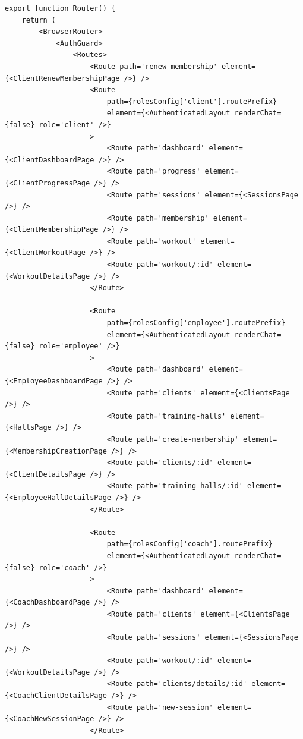 \documentclass[../../spr.tex]{subfiles}
\begin{document}
\begin{lstlisting}[caption=Komponent realizujący \textit{routing} w aplikacji. Definiuje ścieżki i komponenty generujące poszczególne ekrany.]
export function Router() {
    return (
        <BrowserRouter>
            <AuthGuard>
                <Routes>
                    <Route path='renew-membership' element={<ClientRenewMembershipPage />} />
                    <Route
                        path={rolesConfig['client'].routePrefix}
                        element={<AuthenticatedLayout renderChat={false} role='client' />}
                    >
                        <Route path='dashboard' element={<ClientDashboardPage />} />
                        <Route path='progress' element={<ClientProgressPage />} />
                        <Route path='sessions' element={<SessionsPage />} />
                        <Route path='membership' element={<ClientMembershipPage />} />
                        <Route path='workout' element={<ClientWorkoutPage />} />
                        <Route path='workout/:id' element={<WorkoutDetailsPage />} />
                    </Route>

                    <Route
                        path={rolesConfig['employee'].routePrefix}
                        element={<AuthenticatedLayout renderChat={false} role='employee' />}
                    >
                        <Route path='dashboard' element={<EmployeeDashboardPage />} />
                        <Route path='clients' element={<ClientsPage />} />
                        <Route path='training-halls' element={<HallsPage />} />
                        <Route path='create-membership' element={<MembershipCreationPage />} />
                        <Route path='clients/:id' element={<ClientDetailsPage />} />
                        <Route path='training-halls/:id' element={<EmployeeHallDetailsPage />} />
                    </Route>

                    <Route
                        path={rolesConfig['coach'].routePrefix}
                        element={<AuthenticatedLayout renderChat={false} role='coach' />}
                    >
                        <Route path='dashboard' element={<CoachDashboardPage />} />
                        <Route path='clients' element={<ClientsPage />} />
                        <Route path='sessions' element={<SessionsPage />} />
                        <Route path='workout/:id' element={<WorkoutDetailsPage />} />
                        <Route path='clients/details/:id' element={<CoachClientDetailsPage />} />
                        <Route path='new-session' element={<CoachNewSessionPage />} />
                    </Route>


\end{lstlisting}
\end{document}
